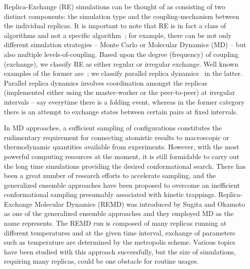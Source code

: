 \documentclass[times, 10pt, twocolumn]{article}
\newcommand{\jhanote}[1]{ {\textcolor{red} { ***SJ: #1 }}}
\newcommand{\jhanote}[1]{}
\begin{document}



Replica-Exchange (RE) simulations can be thought of as consisting of
two distinct components: the simulation type and the
coupling-mechanism between the individual replicas.  It is important
to note that RE is in fact a class of algorithms and not a specific
algorithm~\cite{dpa_surveypaper}; for example, there can be not only
different simulation strategies -- Monte Carlo or Molecular Dynamics
(MD) -- but also multiple levels-of-coupling.  Based upon the degree
(frequency) of coupling (exchange), we classify RE as either regular
or irregular exchange. Well known examples of the former
are~\cite{hansmann,Sugita:1999rm}; we classify parallel replica
dynamics~\cite{SPdynamics, pande_bj03} in the latter. Parallel replica
dynamics involves coordination amongst the replicas (implemented
either using the master-worker or the peer-to-peer) at irregular
intervals -- say everytime there is a folding event, whereas in the
former category there is an attempt to exchange states between certain
pairs at fixed intervals.

In MD approaches, a sufficient sampling of configurations constitutes
the rudimentary requirement for connecting atomistic results to
macroscopic or thermodynamic quantities available from experiments.
However, with the most powerful computing resources at the moment, it
is still formidable to carry out the long time simulations providing
the desired conformational search.  There has been a great number of
research efforts to accelerate sampling, and the generalized ensemble
approaches have been proposed to overcome an inefficient
conformational sampling presumably associated with kinetic trappings.
Replica-Exchange Molecular Dynamics (REMD) was introduced by Sugita
and Okamoto as one of the generalized ensemble approaches and they
employed MD as the name represents.  The REMD run is composed of many
replicas running at different temperatures and at the given time
interval, exchange of parameters such as temperature are determined by
the metropolis scheme.  Various topics have been studied with this
approach successfully, but the size of simulations, requiring many
replicas, could be one obstacle for routine usages.
\end{document}
